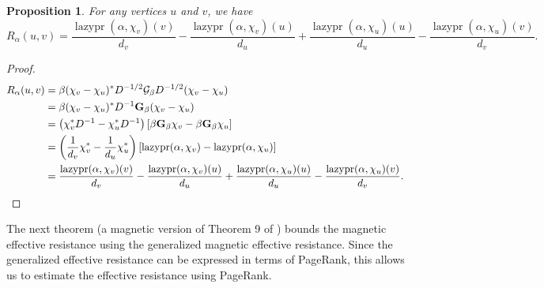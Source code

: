 \documentclass{article}
\newtheorem{prop}[thm]{Proposition}
\theoremstyle{definition}
\DeclareMathOperator{\lazypr}{lazypr}
\newcommand{\green}{\mathcal{G}}
\newcommand{\asymgreen}{\normalfont{\textbf{G}}}
\begin{document}
\begin{prop}
For any vertices $u$ and $v$, we have $$R_\alpha(u, v) = \frac{\lazypr(\alpha, \chi_v)(v)}{d_v} - \frac{\lazypr(\alpha, \chi_v)(u)}{d_u} + \frac{\lazypr(\alpha, \chi_u)(u)}{d_u} - \frac{\lazypr(\alpha, \chi_u)(v)}{d_v}.$$
\end{prop}
\begin{proof}
\begin{align*}
R_\alpha(u, v) &= \beta (\chi_v - \chi_u)^* D^{-1/2} \green_\beta D^{-1/2} (\chi_v - \chi_u) \\
&= \beta (\chi_v - \chi_u)^* D^{-1} \asymgreen_\beta (\chi_v - \chi_u) \\
&= \left( \chi_v^* D^{-1} - \chi_u^* D^{-1} \right) \left[ \beta \asymgreen_\beta \chi_v - \beta \asymgreen_\beta \chi_u \right] \\
&= \left( \frac{1}{d_v} \chi_v^* - \frac{1}{d_u} \chi_u^* \right) \left[ \lazypr(\alpha, \chi_v) - \lazypr(\alpha, \chi_u) \right] \\
&= \frac{\lazypr(\alpha, \chi_v)(v)}{d_v} - \frac{\lazypr(\alpha, \chi_v)(u)}{d_u} + \frac{\lazypr(\alpha, \chi_u)(u)}{d_u} - \frac{\lazypr(\alpha, \chi_u)(v)}{d_v}.
\end{align*}
\end{proof}

The next theorem (a magnetic version of Theorem 9 of \cite{pagerankrandomwalks}) bounds the magnetic effective resistance using the generalized magnetic effective resistance. Since the generalized effective resistance can be expressed in terms of PageRank, this allows us to estimate the effective resistance using PageRank.
\end{document}

